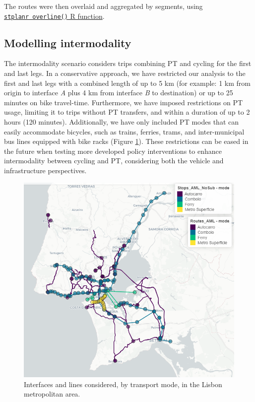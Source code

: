 \documentclass[review, doubleblind, 3p,
authoryear]{elsarticle} %
\begin{document}
The routes were then overlaid and aggregated by segments, using
\href{https://docs.ropensci.org/stplanr/reference/overline.html}{\texttt{stplanr\ overline()}
R function}.

\hypertarget{modelling-intermodality}{%
\subsection{Modelling intermodality}\label{modelling-intermodality}}

The intermodality scenario considers trips combining PT and cycling for
the first and last legs. In a conservative approach, we have restricted
our analysis to the first and last legs with a combined length of up to
5 km (for example: 1 km from origin to interface \emph{A} plus 4 km from
interface \emph{B} to destination) or up to 25 minutes on bike
travel-time. Furthermore, we have imposed restrictions on PT usage,
limiting it to trips without PT transfers, and within a duration of up
to 2 hours (120 minutes). Additionally, we have only included PT modes
that can easily accommodate bicycles, such as trains, ferries, trams,
and inter-municipal bus lines equipped with bike racks (Figure
\ref{fig:map1}). These restrictions can be eased in the future when
testing more developed policy interventions to enhance intermodality
between cycling and PT, considering both the vehicle and infrastructure
perspectives.

\begin{figure}

{\centering \includegraphics[width=0.6\linewidth,]{img/map1} 

}

\caption{Interfaces and lines considered, by transport mode, in the Lisbon metropolitan area.}\label{fig:map1}
\end{figure}
\end{document}
